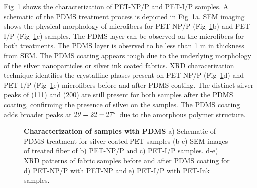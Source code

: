 \documentclass[10pt,letterpaper]{article}
\begin{document}
Fig~\ref{fig3} shows the characterization of PET-NP/P and PET-I/P samples. A schematic of the  PDMS treatment process is depicted in Fig~\ref{fig3}a.
SEM imaging shows the physical morphology of microfibers for PET-NP/P (Fig~\ref{fig3}b) and PET-I/P (Fig~\ref{fig3}c) samples. The PDMS layer can be observed on the microfibers for both treatments. The PDMS layer is observed to be less than 1 \micro m in thickness from SEM. The PDMS coating appears rough due to the underlying morphology of the silver nanoparticles or silver ink coated fabrics.
XRD characerization technique identifies the crystalline phases present on PET-NP/P (Fig~\ref{fig3}d) and PET-I/P (Fig~\ref{fig3}e) microfibers before and after PDMS coating. The distinct silver peaks of (111) and (200) are still present for both samples after the PDMS coating, confirming the presence of silver on the samples. The PDMS coating adds broader peaks at $2\theta = 22-27\degree$~due to the amorphous polymer structure. 

\begin{figure}[!h]
\caption{{\bf Characterization of samples with PDMS}{
a) Schematic of PDMS treatment for silver coated PET samples (b-c) SEM images of treated fiber of b) PET-NP/P and c) PET-I/P samples. d-e) XRD patterns of fabric samples before and after PDMS coating for d) PET-NP/P with PET-NP and e) PET-I/P with PET-Ink samples.}}
\label{fig3}
\end{figure}

\end{document}
